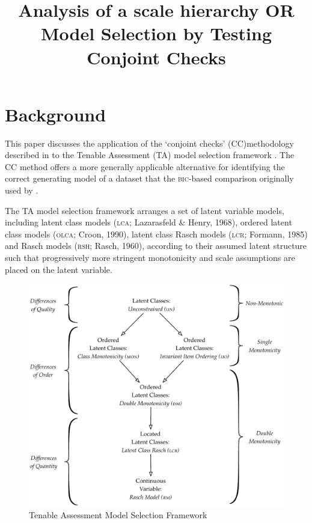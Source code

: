 \documentclass[12pt]{article}
\title{Analysis of a scale hierarchy OR Model Selection by Testing Conjoint Checks}
\date{}
\begin{document}
\maketitle
\onehalfspacing
\section{Background}
This paper discusses the application of the `conjoint checks' (CC)methodology described in  to the Tenable Assessment (TA) model selection framework . The CC method offers a more generally applicable alternative for identifying the correct generating model of a dataset that the \textsc{bic}-based comparison originally used by .

The TA model selection framework  arranges a set of latent variable models, including latent class models (\textsc{lca}; Lazarasfeld \& Henry, 1968), ordered latent class models (\textsc{olca}; Croon, 1990), latent class Rasch models (\textsc{lcr}; Formann, 1985) and Rasch models (\textsc{rsh}; Rasch, 1960), according to their assumed latent structure such that progressively more stringent monotonicity and scale assumptions are placed on the latent variable. 

\begin{figure}
\centering
\caption{Tenable Assessment Model Selection Framework} \label{orig}
\includegraphics[width=\textwidth]{./figs/TAmodelframework.pdf}
\end{figure}
\end{document}
